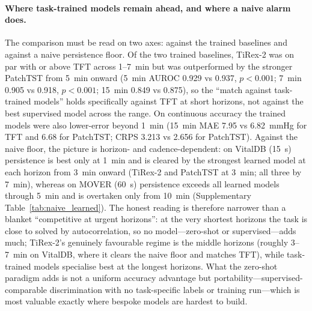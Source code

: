 \documentclass[11pt]{article}
\begin{document}
\paragraph{Where task-trained models remain ahead, and where a naive alarm
does.} The comparison must be read on two axes: against the trained baselines
and against a naive persistence floor. Of the two trained baselines, TiRex-2
was on par with or above TFT across 1--7~min but was outperformed by the stronger PatchTST from
5~min onward (5~min AUROC 0.929 vs 0.937, $p<0.001$; 7~min 0.905 vs 0.918,
$p<0.001$; 15~min 0.849 vs 0.875), so the ``match against task-trained
models'' holds specifically against TFT at short horizons, not against the
best supervised model across the range. On continuous accuracy the trained
models were also lower-error beyond 1~min (15~min MAE 7.95 vs 6.82~mmHg for
TFT and 6.68 for PatchTST; CRPS 3.213 vs 2.656 for PatchTST). Against the
naive floor, the picture is horizon- and cadence-dependent: on VitalDB
(15~s) persistence is best only at 1~min and is cleared by the strongest
learned model at each horizon from 3~min onward (TiRex-2 and PatchTST at
3~min; all three by 7~min), whereas on MOVER (60~s) persistence exceeds all
learned models through 5~min and is overtaken only from 10~min (Supplementary
Table~\ref{tab:naive_learned}). The honest reading is therefore narrower than
a blanket ``competitive at urgent horizons'': at the very shortest horizons
the task is close to solved by autocorrelation, so no model---zero-shot or
supervised---adds much; TiRex-2's genuinely favourable regime is the middle
horizons (roughly 3--7~min on VitalDB, where it clears the naive floor and
matches TFT), while task-trained models specialise best at the longest
horizons. What the zero-shot paradigm adds is not a uniform accuracy
advantage but portability---supervised-comparable discrimination with no
task-specific labels or training run---which is most valuable exactly where
bespoke models are hardest to build.
\end{document}
